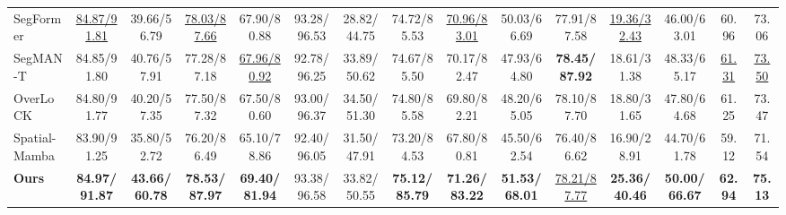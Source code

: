 \documentclass[lettersize,journal]{IEEEtran}
\begin{document}
\begin{table}[!t]
\begin{tabular}{lcccccccccccccc}
SegFormer\cite{xie2021segformer} &\underline{84.87/91.81} & 39.66/56.79 & \underline{78.03/87.66} & 67.90/80.88 & 93.28/96.53 & 28.82/44.75 & 74.72/85.53 & \underline{70.96/83.01} & 50.03/66.69 & 77.91/87.58 & \underline{19.36/32.43} & 46.00/63.01 & 60.96 & 73.06 \\
SegMAN-T\cite{SegMAN} &84.85/91.80 & 40.76/57.91 & 77.28/87.18 & \underline{67.96/80.92} & 92.78/96.25 & 33.89/50.62 & 74.67/85.50 & 70.17/82.47 & 47.93/64.80 & \textbf{78.45/87.92} & 18.61/31.38 & 48.33/65.17 & \underline{61.31} & \underline{73.50} \\
OverLoCK\cite{lou2025overlock} &84.80/91.77 & 40.20/57.35 & 77.50/87.32 & 67.50/80.60 & 93.00/96.37 & 34.50/51.30 & 74.80/85.58 & 69.80/82.21 & 48.20/65.05 & 78.10/87.70 & 18.80/31.65 & 47.80/64.68 & 61.25 & 73.47 \\
Spatial-Mamba\cite{xiao2025spatialmamba} &83.90/91.25 & 35.80/52.72 & 76.20/86.49 & 65.10/78.86 & 92.40/96.05 & 31.50/47.91 & 73.20/84.53 & 67.80/80.81 & 45.50/62.54 & 76.40/86.62 & 16.90/28.91 & 44.70/61.78 & 59.12 & 71.54 \\
\hline
\textbf{Ours} & \textbf{84.97/91.87} & \textbf{43.66/60.78} & \textbf{78.53/87.97} & \textbf{69.40/81.94} & 93.38/96.58 & 33.82/50.55 & \textbf{75.12/85.79} & \textbf{71.26/83.22} & \textbf{51.53/68.01} & \underline{78.21/87.77} & \textbf{25.36/40.46} & \textbf{50.00/66.67} & \textbf{62.94} & \textbf{75.13} \\
\hline
\end{tabular}
\end{table}
\end{document}
